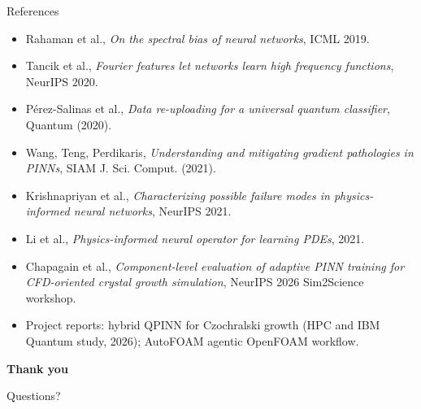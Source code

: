 \documentclass[aspectratio=169]{beamer}
\begin{document}
\begin{frame}{References}
\footnotesize
\begin{itemize}\setlength{\itemsep}{2pt}
  \item Rahaman et al., \emph{On the spectral bias of neural networks}, ICML 2019.
  \item Tancik et al., \emph{Fourier features let networks learn high frequency functions}, NeurIPS 2020.
  \item P\'erez-Salinas et al., \emph{Data re-uploading for a universal quantum classifier}, Quantum (2020).
  \item Wang, Teng, Perdikaris, \emph{Understanding and mitigating gradient pathologies in PINNs}, SIAM J. Sci. Comput. (2021).
  \item Krishnapriyan et al., \emph{Characterizing possible failure modes in physics-informed neural networks}, NeurIPS 2021.
  \item Li et al., \emph{Physics-informed neural operator for learning PDEs}, 2021.
  \item Chapagain et al., \emph{Component-level evaluation of adaptive PINN training for CFD-oriented crystal growth simulation}, NeurIPS 2026 Sim2Science workshop.
  \item Project reports: hybrid QPINN for Czochralski growth (HPC and IBM Quantum study, 2026); AutoFOAM agentic OpenFOAM workflow.
\end{itemize}
\end{frame}

\begin{frame}
\centering
\Large \textbf{Thank you}

\vspace{0.5cm}
\normalsize
Questions?
\end{frame}
\end{document}
